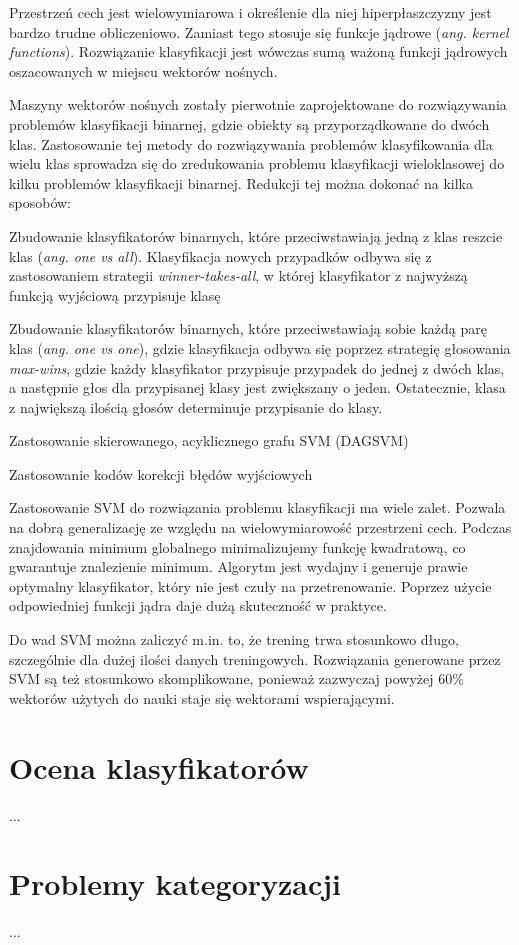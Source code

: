 Przestrzeń cech jest wielowymiarowa i określenie dla niej hiperpłaszczyzny jest bardzo trudne obliczeniowo. Zamiast tego stosuje się funkcje jądrowe (\emph{ang. kernel functions}). Rozwiązanie klasyfikacji jest wówczas sumą ważoną funkcji jądrowych oszacowanych w miejscu wektorów nośnych.

Maszyny wektorów nośnych zostały pierwotnie zaprojektowane do rozwiązywania problemów klasyfikacji binarnej, gdzie obiekty są przyporządkowane do dwóch klas. Zastosowanie tej metody do rozwiązywania problemów klasyfikowania dla wielu klas sprowadza się do zredukowania problemu klasyfikacji wieloklasowej do kilku problemów klasyfikacji binarnej.\cite{DUAN05} Redukcji tej można dokonać na kilka sposobów:

\begin{compactitem}
	\item Zbudowanie klasyfikatorów binarnych, które przeciwstawiają jedną z klas reszcie klas (\emph{ang. one vs all}). Klasyfikacja nowych przypadków odbywa się z zastosowaniem strategii \emph{winner-takes-all}, w której klasyfikator z najwyższą funkcją wyjściową przypisuje klasę
	\item Zbudowanie klasyfikatorów binarnych, które przeciwstawiają sobie każdą parę klas (\emph{ang. one vs one}), gdzie klasyfikacja odbywa się poprzez strategię głosowania \emph{max-wins}, gdzie każdy klasyfikator przypisuje przypadek do jednej z dwóch klas, a następnie głos dla przypisanej klasy jest zwiększany o jeden. Ostatecznie, klasa z największą ilością głosów determinuje przypisanie do klasy.
	\item Zastosowanie skierowanego, acyklicznego grafu SVM (DAGSVM)\cite{PLATT00}
	\item Zastosowanie kodów korekcji błędów wyjściowych\cite{DIETTERICH94}
\end{compactitem}

Zastosowanie SVM do rozwiązania problemu klasyfikacji ma wiele zalet. Pozwala na dobrą generalizację ze względu na wielowymiarowość przestrzeni cech. Podczas znajdowania minimum globalnego minimalizujemy funkcję kwadratową, co gwarantuje znalezienie minimum. Algorytm jest wydajny i generuje prawie optymalny klasyfikator, który nie jest czuły na przetrenowanie. Poprzez użycie odpowiedniej funkcji jądra daje dużą skuteczność w praktyce.\cite{WOLTER07}

Do wad SVM można zaliczyć m.in. to, że trening trwa stosunkowo długo, szczególnie dla dużej ilości danych treningowych. Rozwiązania generowane przez SVM są też stosunkowo skomplikowane, ponieważ zazwyczaj powyżej 60\% wektorów użytych do nauki staje się wektorami wspierającymi.\cite{WOLTER07}

\section{Ocena klasyfikatorów}
...

\section{Problemy kategoryzacji}
...